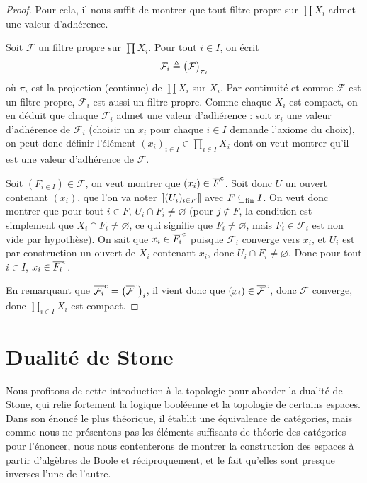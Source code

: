 \begin{proof}
  Pour cela, il nous suffit de montrer que tout filtre propre sur $\prod X_i$
  admet une valeur d'adhérence.

  Soit $\mathcal F$ un filtre propre sur $\prod X_i$. Pour tout $i\in I$, on
  écrit
  \[\mathcal F_i \triangleq \big(\mathcal F\big)_{\pi_i}\]
  où $\pi_i$ est la projection (continue) de $\prod X_i$ sur $X_i$. Par
  continuité et comme $\mathcal F$ est un filtre propre, $\mathcal F_i$ est
  aussi un filtre propre. Comme
  chaque $X_i$ est compact, on en déduit que chaque $\mathcal F_i$ admet une
  valeur d'adhérence : soit $x_i$ une valeur d'adhérence de $\mathcal F_i$
  (choisir un $x_i$ pour chaque $i\in I$ demande l'axiome du choix), on
  peut donc définir l'élément
  $\displaystyle (x_i)_{i\in I}\in \prod_{i \in I}X_i$
  dont on veut montrer qu'il est une valeur d'adhérence de $\mathcal F$.

  Soit $(F_{i\in I})\in \mathcal F$, on veut montrer que $(x_i)\in \overline{F}^{\mathrm c}$.
  Soit donc $U$ un ouvert contenant $(x_i)$, que l'on va noter
  $\llbracket (U_i)_{i\in F}\rrbracket$ avec $F\subseteq_{\mathrm{fin}} I$. On veut donc montrer que pour
  tout $i\in F$, $U_i\cap F_i\neq\varnothing$ (pour $j\notin F$, la condition
  est simplement que $X_i \cap F_i\neq\varnothing$, ce qui signifie que
  $F_i\neq\varnothing$, mais $F_i\in\mathcal F_i$ est non vide par hypothèse).
  On sait que $x_i \in \overline{F_i}^{\mathrm c}$ puisque $\mathcal F_i$ converge vers
  $x_i$, et $U_i$ est par construction un ouvert de $X_i$ contenant $x_i$,
  donc $U_i\cap F_i \neq\varnothing$. Donc pour tout $i\in I$,
  $x_i\in \overline{F_i}^{\mathrm c}$.

  En remarquant que $\overline{\mathcal F_i}^{\mathrm c} = \big(\overline{\mathcal F}^{\mathrm c}\big)_i$,
  il vient donc que $(x_i) \in \overline{\mathcal F}^{\mathrm c}$, donc $\mathcal F$
  converge, donc $\displaystyle\prod_{i\in I} X_i$ est compact.
\end{proof}

\section{Dualité de Stone}

Nous profitons de cette introduction à la topologie pour aborder la dualité de
Stone, qui relie fortement la logique booléenne et la topologie de certains
espaces. Dans son énoncé le plus théorique, il établit une équivalence de
catégories, mais comme nous ne présentons pas les éléments suffisants de théorie
des catégories pour l'énoncer, nous nous contenterons de montrer la construction
des espaces à partir d'algèbres de Boole et réciproquement, et le fait qu'elles
sont presque inverses l'une de l'autre.

